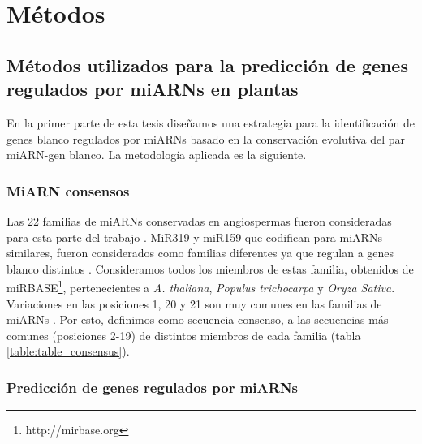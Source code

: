 \graphicspath{{Materials/Figs/}}

\chapter{Métodos} 

\section{Métodos utilizados para la predicción de genes regulados por miARNs en plantas}

En la primer parte de esta tesis diseñamos una estrategia para la identificación de genes blanco regulados por miARNs basado en la conservación evolutiva del par miARN-gen blanco.
La metodología aplicada es la siguiente.

\subsection{MiARN consensos}
Las 22 familias de miARNs conservadas en angiospermas fueron consideradas para esta parte del trabajo \citep{Fahlgren2010,Axtell2008343}.
MiR319 y miR159 que codifican para miARNs similares, fueron considerados como familias diferentes ya que regulan a genes blanco distintos \citep{Palatnik2007}.
Consideramos todos los miembros de estas familia, obtenidos de miRBASE\footnote{http://mirbase.org}, pertenecientes a \textit{A. thaliana}, \textit{Populus trichocarpa} y \textit{Oryza Sativa}.
Variaciones en las posiciones 1, 20 y 21 son muy comunes en las familias de miARNs \citep{10.1371/journal.pgen.1002419}. 
Por esto, definimos como secuencia consenso, a las secuencias más comunes (posiciones 2-19) de distintos miembros de cada familia (tabla \ref{table:table_consensus}).

\subsection{Predicción de genes regulados por miARNs}

